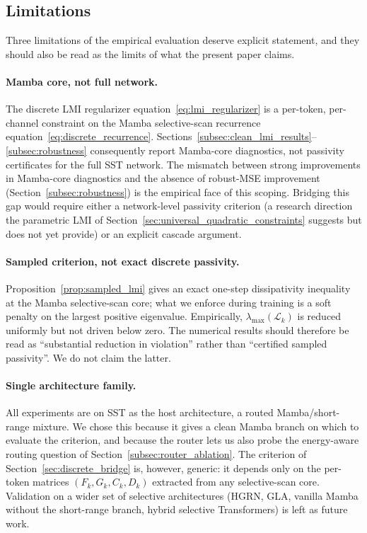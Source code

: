 \documentclass[10pt]{article} %
\def\eqref#1{equation~\ref{#1}}
\theoremstyle{definition}
\begin{document}
\subsection{Limitations}
\label{subsec:limitations}

Three limitations of the empirical evaluation deserve explicit statement, and they should also be read as the limits of what the present paper claims.

\paragraph{Mamba core, not full network.}
The discrete LMI regularizer \eqref{eq:lmi_regularizer} is a per-token, per-channel constraint on the Mamba selective-scan recurrence \eqref{eq:discrete_recurrence}. Sections~\ref{subsec:clean_lmi_results}--\ref{subsec:robustness} consequently report Mamba-core diagnostics, not passivity certificates for the full SST network. The mismatch between strong improvements in Mamba-core diagnostics and the absence of robust-MSE improvement (Section~\ref{subsec:robustness}) is the empirical face of this scoping. Bridging this gap would require either a network-level passivity criterion (a research direction the parametric LMI of Section~\ref{sec:universal_quadratic_constraints} suggests but does not yet provide) or an explicit cascade argument.

\paragraph{Sampled criterion, not exact discrete passivity.}
Proposition~\ref{prop:sampled_lmi} gives an exact one-step dissipativity inequality at the Mamba selective-scan core; what we enforce during training is a soft penalty on the largest positive eigenvalue. Empirically, $\lambda_{\max}(\mathcal{L}_k)$ is reduced uniformly but not driven below zero. The numerical results should therefore be read as ``substantial reduction in violation'' rather than ``certified sampled passivity''. We do not claim the latter.

\paragraph{Single architecture family.}
All experiments are on SST as the host architecture, a routed Mamba/short-range mixture. We chose this because it gives a clean Mamba branch on which to evaluate the criterion, and because the router lets us also probe the energy-aware routing question of Section~\ref{subsec:router_ablation}. The criterion of Section~\ref{sec:discrete_bridge} is, however, generic: it depends only on the per-token matrices $(F_k,G_k,C_k,D_k)$ extracted from any selective-scan core. Validation on a wider set of selective architectures (HGRN, GLA, vanilla Mamba without the short-range branch, hybrid selective Transformers) is left as future work.
\end{document}
